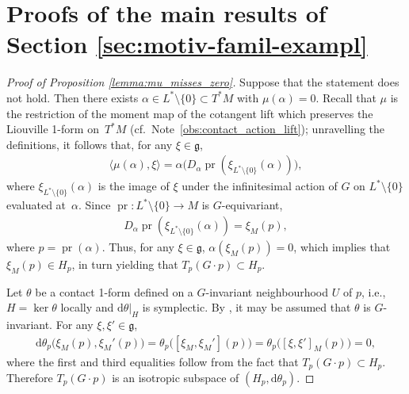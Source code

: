 \documentclass[pdftex]{sigma}
\numberwithin{equation}{section}
\newcommand{\de}{\mathrm{d}} %
\newcommand{\CM}{(M,H)} %
\newcommand{\SYM}{L^* \setminus \{0\}} %
\begin{document}
\section{Proofs of the main results of Section \ref{sec:motiv-famil-exampl}}\label{sec:proofs-sect-refs}

\begin{proof}[Proof of Proposition \ref{lemma:mu_misses_zero}] Suppose that the statement does not hold. Then there exists $\alpha \in \SYM \subset T^* M$ with $\mu(\alpha) = 0$. Recall that $\mu$ is the restriction of the moment map of the cotangent lift which preserves the Liouville 1-form on~$T^*M$ (cf.\ Note~\ref{obs:contact_action_lift}); unravelling the def\/initions, it follows that, for any $\xi \in \mathfrak{g}$,
\begin{gather*}
\langle \mu(\alpha), \xi \rangle = \alpha\big(D_{\alpha}\operatorname{pr} (\xi_{\SYM}(\alpha) )\big),
 \end{gather*}
where $\xi_{\SYM}(\alpha)$ is the image of $\xi$ under the inf\/initesimal action of $G$ on $\SYM$ evaluated at~$\alpha$. Since $\operatorname{pr} \colon \SYM \to M$ is $G$-equivariant,
 \begin{gather*}
 D_{\alpha}\operatorname{pr} (\xi_{\SYM}(\alpha) ) = \xi_M(p),
 \end{gather*}
where $p = \operatorname{pr}(\alpha)$. Thus, for any $\xi \in \mathfrak{g}$, $\alpha(\xi_M(p)) = 0$, which implies that $\xi_M(p) \in H_p$, in turn yielding that $T_p ( G \cdot p ) \subset H_p$.

Let $\theta$ be a contact 1-form def\/ined on a $G$-invariant neighbourhood $U$ of $p$, i.e., $H = \ker \theta$ locally and $\de \theta|_H$ is symplectic. By \cite[Lemma~2.6]{lerman_contact_toric}, it may be assumed that $\theta$ is $G$-invariant. For any $\xi, \xi' \in \mathfrak{g}$,
 \begin{gather*}
 \de \theta_p\big(\xi_M(p), \xi_M'(p) \big) = \theta_p \big([\xi_M , \xi_M'](p) \big) = \theta_p\big([\xi, \xi']_M (p)\big) = 0,
 \end{gather*}
 where the f\/irst and third equalities follow from the fact that $T_p(G \cdot p) \subset H_p$. Therefore $T_p(G \cdot p )$ is an isotropic subspace of $(H_p,\de \theta_p)$.


\end{proof}
\end{document}
